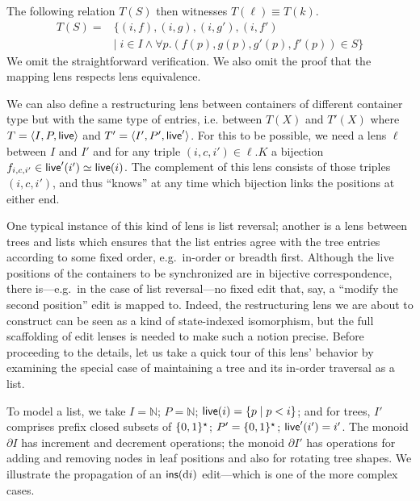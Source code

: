 \begin{pf}
The following relation $T(S)$ then witnesses $T(\ell)\equiv T(k)$. 
\begin{align*}
    T(S) ={}& \{(i,f),(i,g),(i,g'),(i,f') \\
            & |\;i{\in}I\wedge \forall p.(f(p), g(p), g'(p), f'(p))\in S\}
\end{align*}
We omit the straightforward verification. 
\else
    We also omit the proof that the mapping lens respects lens
    equivalence. 
 \fi
\end{pf}
\fi

We can also define a restructuring lens between containers of
different container type but with the same type of entries, i.e.
between $T(X)$ and $T'(X)$ where $T=\langle I,P,\mathsf{live}\rangle$ and
$T'=\langle I',P',\mathsf{live}'\rangle$. For this to be possible, we need a
lens $\ell$ between $I$ and $I'$ and for any triple
$(i,c,i')\in\ell.K$ a bijection
$f_{i,c,i'}\in\mathsf{live}'(i')\simeq\mathsf{live}(i)$.  
%
The complement of this lens consists of those
triples $(i,c,i')$, and thus ``knows'' at
any time which bijection links the positions at either end. 

One typical instance of this kind of lens is list reversal; another is a lens
between trees and lists which ensures that the list entries agree with the
tree entries according to some fixed order, e.g.\ in-order  or breadth first.
Although the live positions of the containers to be synchronized are
in bijective correspondence, there is---e.g.\ in the case of list
reversal---no fixed edit that, say, a ``modify the second position''
edit is mapped to. Indeed, the restructuring lens we are about to
construct can be seen as a kind of state-indexed isomorphism, but the
full scaffolding of edit lenses is needed to make such a notion
precise. Before proceeding to the details, let us take a quick tour of this
lens' behavior by examining the special case of maintaining a tree and its
in-order traversal as a list.

To model a list, we take $I=\mathbb{N}$; $P=\mathbb{N}$; $\mathsf{live}(i)=\{p\mid
p<i\}$; and for trees, $I'$ comprises prefix closed subsets of $\{0,1\}^\star$;
$P'=\{0,1\}^\star$; $\mathsf{live}'(i')=i'$. The monoid $\partial I$ has increment
and decrement operations; the monoid $\partial I'$ has operations for
adding and removing nodes in leaf positions and also for rotating tree
shapes. We illustrate the propagation of an $\mathsf{ins}(\textrm{d} i)$ edit---which is one
of the more complex cases.

